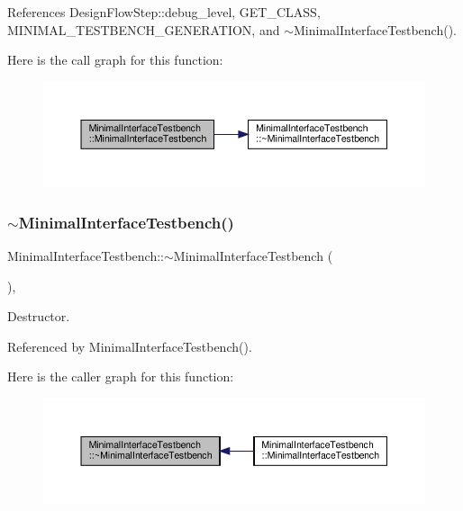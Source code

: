References Design\+Flow\+Step\+::debug\+\_\+level, G\+E\+T\+\_\+\+C\+L\+A\+SS, M\+I\+N\+I\+M\+A\+L\+\_\+\+T\+E\+S\+T\+B\+E\+N\+C\+H\+\_\+\+G\+E\+N\+E\+R\+A\+T\+I\+ON, and $\sim$\+Minimal\+Interface\+Testbench().

Here is the call graph for this function\+:
\nopagebreak
\begin{figure}[H]
\begin{center}
\leavevmode
\includegraphics[width=350pt]{d0/dba/classMinimalInterfaceTestbench_a343f1d02af2a054ebd81ab80dcc55fb9_cgraph}
\end{center}
\end{figure}
\mbox{\label{classMinimalInterfaceTestbench_a0281d137331c6c64fb987a1fe30c7d28}} 
\subsubsection{\texorpdfstring{$\sim$\+Minimal\+Interface\+Testbench()}{~MinimalInterfaceTestbench()}}
{\footnotesize\ttfamily Minimal\+Interface\+Testbench\+::$\sim$\+Minimal\+Interface\+Testbench (\begin{DoxyParamCaption}{ }\end{DoxyParamCaption})\hspace{0.3cm}{\ttfamily [override]}, {\ttfamily [default]}}



Destructor. 



Referenced by Minimal\+Interface\+Testbench().

Here is the caller graph for this function\+:
\nopagebreak
\begin{figure}[H]
\begin{center}
\leavevmode
\includegraphics[width=350pt]{d0/dba/classMinimalInterfaceTestbench_a0281d137331c6c64fb987a1fe30c7d28_icgraph}
\end{center}
\end{figure}


